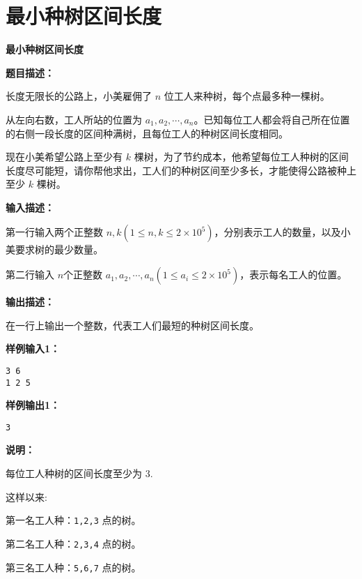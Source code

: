 \documentclass[a4paper]{ctexart}
\begin{document}
\newpage
	
\section{最小种树区间长度}
	
\begin{center}
	\Large \textbf{最小种树区间长度}
\end{center}
	
\vspace{10pt}
	
\noindent\textbf{题目描述：}

长度无限长的公路上，小美雇佣了 $n$ 位工人来种树，每个点最多种一棵树。
	
从左向右数，工人所站的位置为 $a_1, a_2, \cdots, a_n$。已知每位工人都会将自己所在位置的右侧一段长度的区间种满树，且每位工人的种树区间长度相同。
	
现在小美希望公路上至少有 $k$ 棵树，为了节约成本，他希望每位工人种树的区间长度尽可能短，请你帮他求出，工人们的种树区间至少多长，才能使得公路被种上至少 $k$ 棵树。
	
\noindent\textbf{输入描述：}
	
第一行输入两个正整数 $n, k(1 \leq n, k \leq 2 \times 10^5)$，分别表示工人的数量，以及小美要求树的最少数量。
	
第二行输入 $n$个正整数 $a_1, a_2, \cdots, a_n (1 \leq a_i \leq 2 \times 10^5)$，表示每名工人的位置。
	
\noindent\textbf{输出描述：} 
	
在一行上输出一个整数，代表工人们最短的种树区间长度。
	
\noindent\textbf{样例输入1：}
	
\lstset{numbers=none}
\begin{lstlisting}
3 6
1 2 5
\end{lstlisting}
\lstset{numbers=left}
	
\noindent\textbf{样例输出1：}
\lstset{numbers=none}
\begin{lstlisting}
3	
\end{lstlisting}
\lstset{numbers=left}
	
\noindent\textbf{说明：}

每位工人种树的区间长度至少为 3.

这样以来:

第一名工人种：\texttt{1,2,3} 点的树。

第二名工人种：\texttt{2,3,4} 点的树。

第三名工人种：\texttt{5,6,7} 点的树。
\end{document}
